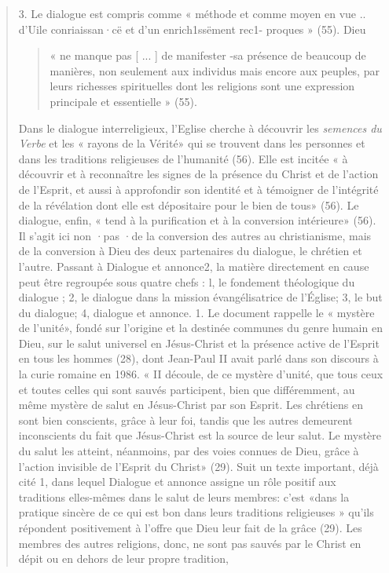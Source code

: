 \begin{quote}
3. Le dialogue est compris comme « méthode et comme
moyen en vue .. d'Uile conriaissan·cë et d'un enrich1ssëment rec1-
proques » (55). Dieu 
\begin{quote}
    « ne manque pas [ ... ] de manifester -sa
présence de beaucoup de manières, non seulement aux individus
mais encore aux peuples, par leurs richesses spirituelles
dont les religions sont une expression principale et essentielle
» (55).
\end{quote}
 Dans le dialogue interreligieux, l'Eglise cherche
à découvrir les \textit{ semences du Verbe} et les « rayons de la
Vérité» qui se trouvent dans les personnes et dans les traditions
religieuses de l'humanité (56). Elle est incitée « à découvrir
et à reconnaître les signes de la présence du Christ et de
l'action de l'Esprit, et aussi à approfondir son identité et à
témoigner de l'intégrité de la révélation dont elle est dépositaire
pour le bien de tous» (56). Le dialogue, enfin, « tend à la
purification et à la conversion intérieure» (56). Il s'agit ici non
·pas ·de la conversion des autres au christianisme, mais de la
conversion à Dieu des deux partenaires du dialogue, le chrétien
et l'autre.
Passant à Dialogue et annonce2, la matière directement en
cause peut être regroupée sous quatre chefs : l, le fondement 
théologique du dialogue ; 2, le dialogue dans la mission évangélisatrice
de l'Église; 3, le but du dialogue; 4, dialogue et
annonce.
1. Le document rappelle le « mystère de l'unité», fondé sur
l'origine et la destinée communes du genre humain en Dieu,
sur le salut universel en Jésus-Christ et la présence active de
l'Esprit en tous les hommes (28), dont Jean-Paul II avait parlé
dans son discours à la curie romaine en 1986. « II découle, de
ce mystère d'unité, que tous ceux et toutes celles qui sont sauvés
participent, bien que différemment, au même mystère de
salut en Jésus-Christ par son Esprit. Les chrétiens en sont bien
conscients, grâce à leur foi, tandis que les autres demeurent
inconscients du fait que Jésus-Christ est la source de leur salut.
Le mystère du salut les atteint, néanmoins, par des voies
connues de Dieu, grâce à l'action invisible de l'Esprit du
Christ» (29). Suit un texte important, déjà cité 1, dans lequel
Dialogue et annonce assigne un rôle positif aux traditions
elles-mêmes dans le salut de leurs membres: c'est «dans la
pratique sincère de ce qui est bon dans leurs traditions religieuses
» qu'ils répondent positivement à l'offre que Dieu leur
fait de la grâce (29).
Les membres des autres religions, donc, ne sont pas sauvés
par le Christ en dépit ou en dehors de leur propre tradition,

\end{quote}

